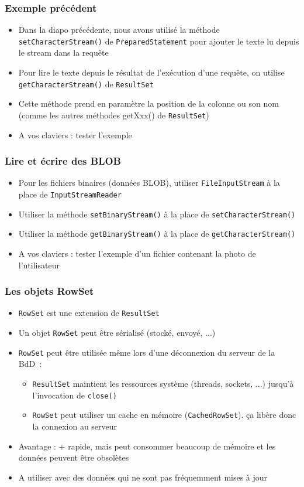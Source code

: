 \documentclass[aspectratio=169,10pt]{beamer}
\begin{document}
\begin{frame}
	\frametitle{Exemple précédent}
	\begin{itemize}
		\item Dans la diapo précédente, nous avons utilisé la méthode \texttt{setCharacterStream()} de \texttt{PreparedStatement} pour ajouter le texte lu depuis le stream dans la requête
		\item Pour lire le texte depuis le résultat de l'exécution d'une requête, on utilise \texttt{getCharacterStream()} de \texttt{ResultSet}
		\item Cette méthode prend en paramètre la position de la colonne ou son nom (comme les autres méthodes getXxx() de \texttt{ResultSet})
		\item A vos claviers : tester l'exemple
	\end{itemize}
\end{frame}

\begin{frame}
\frametitle{Lire et écrire des BLOB}
\begin{itemize}		
		\item Pour les fichiers binaires (données BLOB), utiliser \texttt{FileInputStream} à la place de \texttt{InputStreamReader} 
		\item Utiliser la méthode \texttt{setBinaryStream()} à la place de \texttt{setCharacterStream()}
		\item Utiliser la méthode \texttt{getBinaryStream()} à la place de \texttt{getCharacterStream()}
		\item A vos claviers : tester l'exemple d'un fichier contenant la photo de l'utilisateur
 	\end{itemize}
\end{frame}

\begin{frame}[fragile]
	\frametitle{Les objets RowSet}
	\begin{itemize}		
		\item \texttt{RowSet} est une extension de \texttt{ResultSet}
		\item Un objet \texttt{RowSet} peut être sérialisé (stocké, envoyé, ...)
		\item \texttt{RowSet} peut être utilisée même lors d'une déconnexion du serveur de la BdD~:
		\begin{itemize}
			\item \texttt{ResultSet} maintient les ressources système (threads, sockets, ...) jusqu'à l'invocation de \texttt{close()}
			\item \texttt{RowSet} peut utiliser un cache en mémoire (\texttt{CachedRowSet}). ça libère donc la connexion au serveur
		\end{itemize}
		\item Avantage : + rapide, mais peut consommer beaucoup de mémoire et les données peuvent être obsolètes
		\item A utiliser avec des données qui ne sont pas fréquemment mises à jour
	\end{itemize}
\end{frame}
\end{document}
